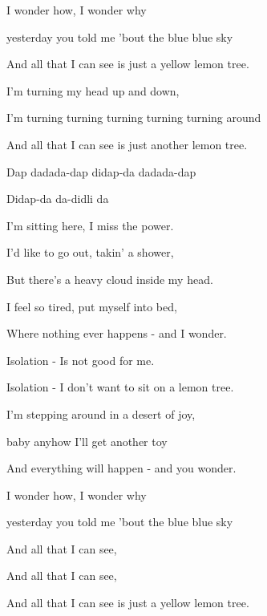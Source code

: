 \begin{song}
\bigskip

\begin{chorusbox}{\Chorus}
I wonder how, I wonder why \par
{}yesterday you told me 'bout the blue blue sky \par
And all that I can see is just a yellow lemon tree.  \par

\bigskip

I'm turning my head up and down, \par
I'm turning turning turning turning turning around \par
And all that I can see is just another lemon tree.  \par
\end{chorusbox}

\bigskip

Dap  dadada-dap didap-da dadada-dap \par
{}Didap-da  da-didli da   \par

\bigskip

I'm sitting here, I miss the power. \par
I'd like to go out, takin' a shower, \par
But there's a heavy cloud inside my head. \par
I feel so tired, put myself into bed, \par
Where nothing ever happens -  and I wonder.   \par

\bigskip

 Isolation - Is not good for me. \par
{} Isolation - I don't want to  sit on a lemon tree. \par

\bigskip

I'm stepping around in a desert of joy, \par
{}baby anyhow I'll get another toy \par
And everything will happen -  and you wonder.   \par

\bigskip

\Chorus

\bigskip

I wonder how, I wonder why \par
{}yesterday you told me 'bout the blue blue sky \par
And all that I can see, \par
And all that I can see, \par
And all that I can see is just a yellow lemon tree. \par

\end{song}
